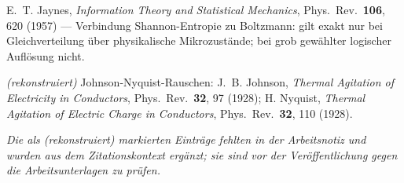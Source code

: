 \documentclass[11pt,a4paper]{article}
\begin{document}
\begin{description}[leftmargin=3.2em,style=sameline,itemsep=0.3em]
\item[{[B19]}] E.~T. Jaynes, \emph{Information Theory and Statistical Mechanics},
Phys.\ Rev.\ \textbf{106}, 620 (1957) --- Verbindung Shannon-Entropie zu
Boltzmann: gilt exakt nur bei Gleichverteilung über physikalische Mikrozustände;
bei grob gewählter logischer Auflösung nicht.

\item[{[B20]}] \emph{(rekonstruiert)} Johnson-Nyquist-Rauschen: J.~B. Johnson,
\emph{Thermal Agitation of Electricity in Conductors}, Phys.\ Rev.\ \textbf{32},
97 (1928); H. Nyquist, \emph{Thermal Agitation of Electric Charge in Conductors},
Phys.\ Rev.\ \textbf{32}, 110 (1928).

\end{description}
\endgroup

\vspace{1em}
\noindent
{\small\itshape Die als \emph{(rekonstruiert)} markierten Einträge fehlten in der
Arbeitsnotiz und wurden aus dem Zitationskontext ergänzt; sie sind vor der
Veröffentlichung gegen die Arbeitsunterlagen zu prüfen.}
\end{document}

